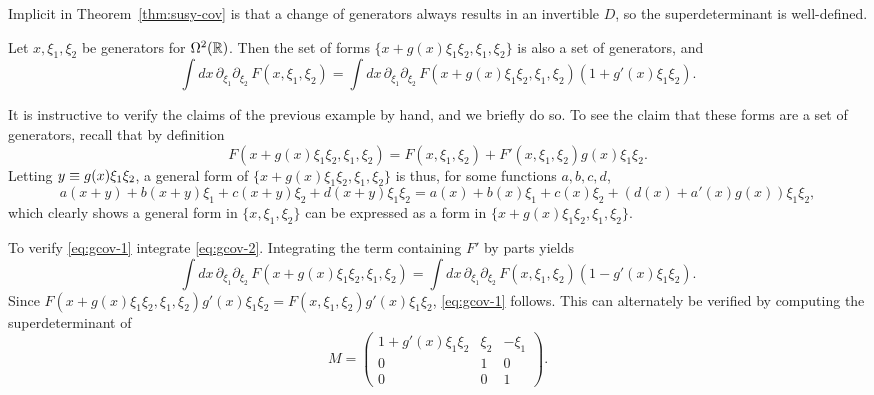 \documentclass[11pt,a4paper]{article}
\begin{document}
Implicit in Theorem~\ref{thm:susy-cov} is that a change of
generators always results in an invertible $D$, so the
superdeterminant is well-defined.

\begin{example} \label{ex:chvarmixed}
  Let $x,\xi_1,\xi_2$ be generators for $\Omega^2(\mathbb{R})$. Then
  the set of forms
  $\{x + g(x)\xi_1\xi_2, \xi_{1}, \xi_{2}\}$
  is also a set of generators, and
  \begin{equation}
    \label{eq:gcov-1}
    \int dx\, \partial_{\xi_1}\partial_{\xi_2} \, F(x,\xi_1,\xi_2)
    =
    \int dx\, \partial_{\xi_1}\partial_{\xi_2} \,
    F(x+g(x)\xi_1\xi_2,\xi_1,\xi_2) (1+g'(x)\xi_1\xi_2)  .
  \end{equation}
\end{example}


It is instructive to verify the claims of the previous example
by hand, and we briefly do so.  To see the claim that these forms are a set
of generators, recall that by definition 
\begin{equation}
  \label{eq:gcov-2}
  F(x+g(x)\xi_1\xi_2,\xi_1,\xi_2) = F(x,\xi_1,\xi_2) + F'(x,\xi_1,\xi_2) g(x)\xi_1\xi_2.
\end{equation}
Letting $y\equiv g(x)\xi_{1}\xi_{2}$, a general form of $\{x +
  g(x)\xi_1\xi_2, \xi_{1}, \xi_{2}\}$ is thus, for some functions $a,b,c,d$,
\begin{equation*}
  a(x+y) + b(x+y)\xi_{1} + c(x+y)\xi_{2} + d(x+y)\xi_{1}\xi_{2}
  =
  a(x) + b(x)\xi_{1} + c(x)\xi_{2} +
  (d(x)+a'(x)g(x))\xi_{1}\xi_{2},
\end{equation*}
which clearly shows a general form in $\{x,\xi_{1},\xi_{2}\}$ can be
expressed as a form in $\{x+g(x)\xi_{1}\xi_{2},\xi_{1},\xi_{2}\}$.

To verify \eqref{eq:gcov-1} integrate \eqref{eq:gcov-2}. Integrating
the term containing $F'$ by parts yields
\begin{equation}
  \int dx \, \partial_{\xi_1}\partial_{\xi_2} \,
  F(x+g(x)\xi_1\xi_2,\xi_1,\xi_2)
  =
  \int dx \, \partial_{\xi_1}\partial_{\xi_2} \,
  F(x,\xi_1,\xi_2) (1-g'(x)\xi_1\xi_2).
\end{equation}
Since
$F(x+g(x)\xi_1\xi_2,\xi_1,\xi_2) g'(x)\xi_1\xi_2 = F(x,\xi_1,\xi_2)
g'(x)\xi_1\xi_2$, \eqref{eq:gcov-1} follows. This can
  alternately be verified by computing the superdeterminant of
  \begin{equation}
    \label{eq:exM}
    M = \begin{pmatrix} 1+g'(x)\xi_{1}\xi_{2} & \xi_{2} & -\xi_{1} \\
      0 & 1 & 0 \\ 0 & 0 & 1 \end{pmatrix}.
  \end{equation}
\end{document}
